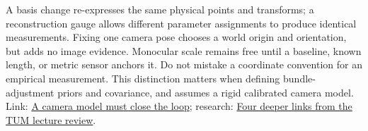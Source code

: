 A basis change re-expresses the same physical points and transforms; a reconstruction gauge allows different parameter assignments to produce identical measurements. Fixing one camera pose chooses a world origin and orientation, but adds no image evidence. Monocular scale remains free until a baseline, known length, or metric sensor anchors it. Do not mistake a coordinate convention for an empirical measurement. This distinction matters when defining bundle-adjustment priors and covariance, and assumes a rigid calibrated camera model. Link: \href{Continuous\%20Notes/Computing\%20Foundations\%20-\%20From\%20Bits\%20to\%20C++\%20and\%20Systems\%20APIs\#A\%20camera\%20model\%20must\%20close\%20the\%20loop}{A camera model must close the loop}; research: \href{Continuous\%20Notes/Computing\%20Foundations\%20-\%20From\%20Bits\%20to\%20C++\%20and\%20Systems\%20APIs\#Four\%20deeper\%20links\%20from\%20the\%20TUM\%20lecture\%20review}{Four deeper links from the TUM lecture review}.
